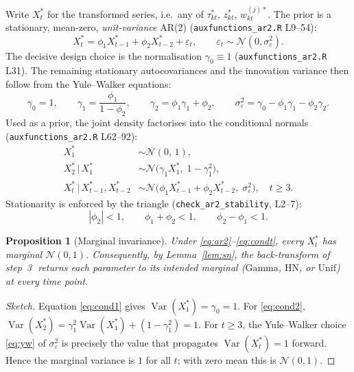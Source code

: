 \documentclass[11pt]{article}
\newtheorem{proposition}{Proposition}
\theoremstyle{definition}
\newcommand{\Var}{\operatorname{Var}}
\newcommand{\Norm}{\mathcal{N}}
\newcommand{\Unif}{\mathrm{Unif}}
\newcommand{\Gam}{\mathrm{Gamma}}
\newcommand{\HN}{\mathrm{HN}}
\newcommand{\given}{\,\vert\,}
\newcommand{\code}[1]{\texttt{#1}}
\begin{document}
Write $X^\ast_t$ for the transformed series, i.e.\ any of $\tau^\ast_{kt}$,
$z^\ast_{kt}$, $w^{(j)\ast}_{kt}$. The prior is a stationary, mean-zero,
\emph{unit-variance} AR(2) (\code{auxfunctions\_ar2.R} L9--54):
\begin{equation}
X^\ast_t = \phi_1 X^\ast_{t-1} + \phi_2 X^\ast_{t-2} + \varepsilon_t,
\qquad \varepsilon_t \sim \Norm(0,\sigma_\varepsilon^2).
\label{eq:ar2}
\end{equation}
The decisive design choice is the normalisation $\gamma_0\equiv 1$
(\code{auxfunctions\_ar2.R} L31). The remaining stationary autocovariances and the
innovation variance then follow from the Yule--Walker equations:
\begin{equation}
\gamma_0 = 1,\qquad
\gamma_1 = \frac{\phi_1}{1-\phi_2},\qquad
\gamma_2 = \phi_1\gamma_1 + \phi_2,\qquad
\sigma_\varepsilon^2 = \gamma_0 - \phi_1\gamma_1 - \phi_2\gamma_2.
\label{eq:yw}
\end{equation}
Used as a prior, the joint density factorises into the conditional normals
(\code{auxfunctions\_ar2.R} L62--92):
\begin{align}
X^\ast_1 &\sim \Norm(0,\,1), \label{eq:cond1}\\
X^\ast_2 \given X^\ast_1 &\sim \Norm\!\big(\gamma_1 X^\ast_1,\; 1-\gamma_1^2\big), \label{eq:cond2}\\
X^\ast_t \given X^\ast_{t-1},X^\ast_{t-2} &\sim \Norm\!\big(\phi_1 X^\ast_{t-1} + \phi_2 X^\ast_{t-2},\; \sigma_\varepsilon^2\big), \quad t\ge 3. \label{eq:condt}
\end{align}
Stationarity is enforced by the triangle (\code{check\_ar2\_stability}, L2--7):
\begin{equation}
|\phi_2| < 1,\qquad \phi_1 + \phi_2 < 1,\qquad \phi_2 - \phi_1 < 1.
\label{eq:stab}
\end{equation}

\begin{proposition}[Marginal invariance]
\label{prop:marg}
Under \eqref{eq:ar2}--\eqref{eq:condt}, every $X^\ast_t$ has marginal $\Norm(0,1)$.
Consequently, by Lemma~\ref{lem:sn}, the back-transform of step~\textcircled{3}
returns each parameter to its intended marginal ($\Gam$, $\HN$, or $\Unif$) at every
time point.
\end{proposition}

\begin{proof}[Sketch]
Equation \eqref{eq:cond1} gives $\Var(X^\ast_1)=\gamma_0=1$. For \eqref{eq:cond2},
$\Var(X^\ast_2)=\gamma_1^2\Var(X^\ast_1)+(1-\gamma_1^2)=1$. For $t\ge 3$, the
Yule--Walker choice \eqref{eq:yw} of $\sigma_\varepsilon^2$ is precisely the value
that propagates $\Var(X^\ast_t)=1$ forward. Hence the marginal variance is $1$ for
all $t$; with zero mean this is $\Norm(0,1)$.
\end{proof}
\end{document}
